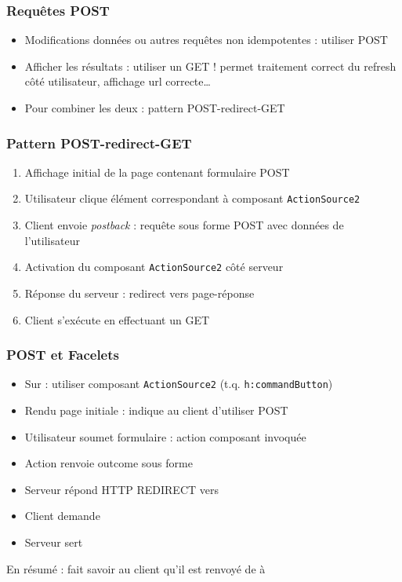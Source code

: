 \documentclass[english, french]{beamer}
\begin{document}
\begin{frame}
	\frametitle{Requêtes POST}
	\begin{itemize}
		\item Modifications données {\tiny ou autres requêtes non idempotentes} : utiliser POST
		\item Afficher les résultats : utiliser un GET ! {\tiny permet traitement correct du refresh côté utilisateur, affichage url correcte…}
		\item Pour combiner les deux : pattern POST-redirect-GET
	\end{itemize}
\end{frame}

\begin{frame}
	\frametitle{Pattern POST-redirect-GET}
	\begin{enumerate}
		\item Affichage initial de la page contenant formulaire POST
		\item Utilisateur clique élément correspondant à composant \texttt{ActionSource2}
		\item Client envoie \emph{postback} : requête sous forme POST avec données de l’utilisateur
		\item Activation du composant \texttt{ActionSource2} côté serveur
		\item Réponse du serveur : redirect vers page-réponse
		\item Client s’exécute en effectuant un GET
	\end{enumerate}
\end{frame}

\begin{frame}
	\frametitle{POST et Facelets}
	\begin{itemize}
		\item Sur  : utiliser composant \texttt{ActionSource2} (t.q. \texttt{h:commandButton})
		\item Rendu page initiale : indique au client d’utiliser POST
		\item Utilisateur soumet formulaire : action composant invoquée
		\item Action renvoie outcome sous forme 
		\item Serveur répond HTTP REDIRECT vers 
		\item Client demande 
		\item Serveur sert 
	\end{itemize}
	En résumé : fait savoir au client qu’il est renvoyé de  à 
\end{frame}
\end{document}
